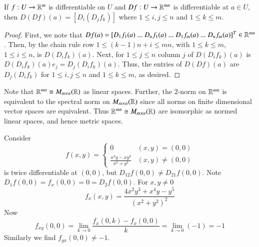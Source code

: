 \begin{proposition}
    If $f:U\rightarrow \mathbb R^m$ is differentiable on $U$ and $Df:U\rightarrow \mathbb R^{mn}$ is differentiable at $a \in U$, then $D(Df)(a) = [D_i(D_jf_k)]$ where $1 \leq i,j\leq n$ and $1 \leq k \leq m$.
\end{proposition}
\begin{proof}
    First, we note that $Df(a) = [D_1f_1(a)\;...\;D_nf_1(a)\;...\;D_1f_m(a)\;...\;D_nf_m(a)]^T \in \mathbb R^{mn}$. Then, by the chain rule row $1 \leq (k-1)n+i \leq mn$, with $1 \leq k \leq m$, $1\leq i \leq n$, is $D(D_if_{k})(a)$. Next, for $1 \leq j \leq n$ column $j$ of $D(D_if_{k})(a)$ is $D(D_if_{k})(a)e_j = D_j(D_if_k)(a)$. Thus, the entries of $D(Df)(a)$ are $D_j(D_if_k)$ for $1 \leq i,j \leq n$ and $1 \leq k \leq m$, as desired.
\end{proof}

Note that $\mathbb R^{mn}\cong M_{m\times n}(\mathbb R)$ as linear spaces. Further, the $2$-norm on $\mathbb R^{mn}$ is equivalent to the spectral norm on $M_{m\times n}(\mathbb R)$ since all norms on finite dimensional vector spaces are equivalent. Thus $\mathbb R^{mn}\cong M_{m\times n}(\mathbb R)$ are isomorphic as normed linear spaces, and hence metric spaces.

\begin{example}
    Consider \begin{equation*}
        f(x,y) = \left\{\begin{array}{cc} 0 & (x,y) = (0,0) \\ \frac{x^3y - xy^3}{x^2+y^2} & (x,y) \neq (0,0)  \end{array}\right.
    \end{equation*}
    is twice differentiable at $(0,0)$, but $D_{12}f(0,0) \neq D_{21}f(0,0)$. Note $D_1f(0,0) = f_x(0,0) = 0 = D_2f(0,0)$. For $x,y \neq 0$ $$f_x(x,y) = \frac{4x^2y^3+x^4y-y^5}{(x^2+y^2)^2}$$ Now $$f_{xy}(0,0) = \lim\limits_{k\rightarrow 0}\frac{f_x(0,k)-f_x(0,0)}{k} = \lim\limits_{k\rightarrow 0}(-1) = -1$$ Similarly we find $f_{yx}(0,0) \neq -1$.
\end{example}

